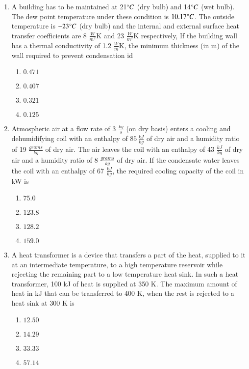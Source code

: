 \documentclass[journal,9pt,onecolumn]{IEEEtran}
\begin{document}
\begin{enumerate}


\item A building has to be maintained at 21$\degree C$ (dry bulb) and 14$\degree C$ (wet bulb). The dew point temperature under these condition is $10.17\degree C$. The outside temperature is $-23\degree C$ (dry bulb) and the internal and external surface heat transfer coefficients are 8 $\frac{W}{m^2}$K and 23 $\frac{W}{m^2}$K respectively, If the building wall has a thermal conductivity of 1.2 $\frac{W}{m}$K, the minimum thickness (in m) of the wall required to prevent condensation id
\begin{multicols}{4}
\begin{enumerate}
    \item $0.471$
    \item $0.407$
    \item $0.321$
    \item $0.125$
\end{enumerate}
\end{multicols}

\item Atmospheric air at a flow rate of 3 $\frac{kg}{s}$ (on dry basis) enters a cooling and dehumidifying coil with an enthalpy of $85\, \frac{kJ}{kg}$ of dry air and a humidity ratio of 19 $\frac{grams}{kg}$ of dry air. The air leaves the coil with an enthalpy of 43 $\frac{kJ}{kg}$ of dry air and a humidity ratio of 8 $\frac{grams}{kg}$ of dry air. If the condensate water leaves the coil with an enthalpy of 67 $\frac{kJ}{kg}$, the required cooling capacity of the coil in kW is
\begin{multicols}{4}
\begin{enumerate}
    \item $75.0$
    \item $123.8$
    \item $128.2$
    \item $159.0$
\end{enumerate}
\end{multicols}



\item A heat transformer is a device that transfers a part of the heat, supplied to it at an intermediate temperature, to a high temperature reservoir while rejecting the remaining part to a low temperature heat sink. In such a heat transformer, 100 kJ of heat is supplied at 350 K. The maximum amount of heat in kJ that can be transferred to 400 K, when the rest is rejected to a heat sink at 300 K is
\begin{multicols}{4}
\begin{enumerate}
    \item $12.50$ 
    \item $14.29$ 
    \item $33.33$ 
    \item $57.14$ 
\end{enumerate}
\end{multicols}


\end{enumerate}
\end{document}
